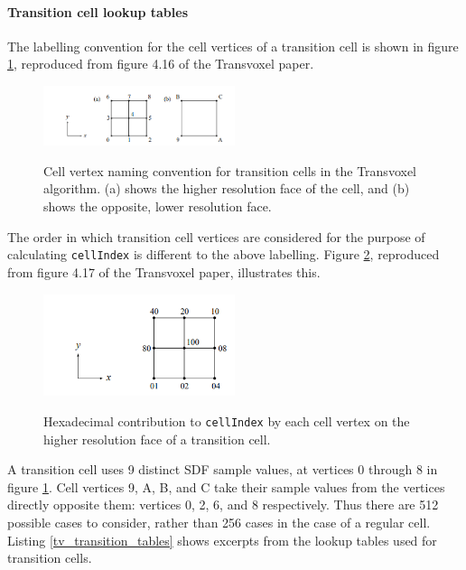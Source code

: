 \documentclass[11pt]{article}
\begin{document}
\paragraph{Transition cell lookup tables}

The labelling convention for the cell vertices of a transition cell is shown in figure \ref{fig:tv_transition_labels}, reproduced from figure 4.16 of the Transvoxel paper\cite{lengyel_2010}.

\begin{figure}
  \caption{Cell vertex naming convention for transition cells in the Transvoxel algorithm. (a) shows the higher resolution face of the cell, and (b) shows the opposite, lower resolution face.}
  \includegraphics[width=0.5\textwidth]{tv_transition_labels.PNG}
  \label{fig:tv_transition_labels}
\end{figure}

The order in which transition cell vertices are considered for the purpose of calculating \texttt{cellIndex} is different to the above labelling. Figure \ref{fig:tv_transition_cellIndex}, reproduced from figure 4.17 of the Transvoxel paper\cite{lengyel_2010}, illustrates this.

\begin{figure}
  \caption{Hexadecimal contribution to \texttt{cellIndex} by each cell vertex on the higher resolution face of a transition cell.}
  \includegraphics[width=0.5\textwidth]{tv_transition_cellIndex.PNG}
  \label{fig:tv_transition_cellIndex}
\end{figure}


A transition cell uses 9 distinct SDF sample values, at vertices 0 through 8 in figure \ref{fig:tv_transition_labels}. Cell vertices 9, A, B, and C take their sample values from the vertices directly opposite them: vertices 0, 2, 6, and 8 respectively. Thus there are 512 possible cases to consider, rather than 256 cases in the case of a regular cell. Listing \ref{tv_transition_tables} shows excerpts from the lookup tables used for transition cells.
\end{document}
